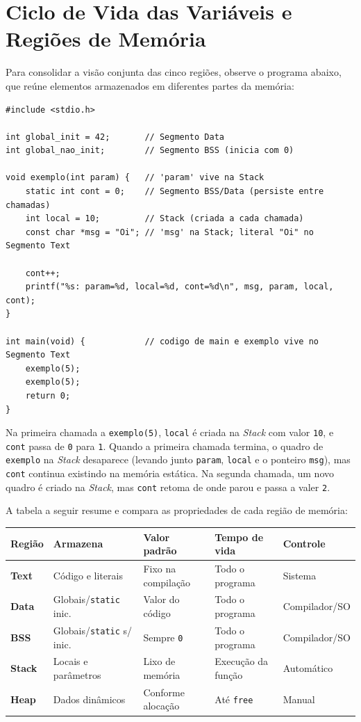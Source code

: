 \section{Ciclo de Vida das Variáveis e Regiões de Memória}
\label{sec:ciclo-vida-regioes}

Para consolidar a visão conjunta das cinco regiões, observe o programa abaixo, que reúne elementos armazenados em diferentes partes da memória:

\begin{lstlisting}
#include <stdio.h>

int global_init = 42;       // Segmento Data
int global_nao_init;        // Segmento BSS (inicia com 0)

void exemplo(int param) {   // 'param' vive na Stack
    static int cont = 0;    // Segmento BSS/Data (persiste entre chamadas)
    int local = 10;         // Stack (criada a cada chamada)
    const char *msg = "Oi"; // 'msg' na Stack; literal "Oi" no Segmento Text

    cont++;
    printf("%s: param=%d, local=%d, cont=%d\n", msg, param, local, cont);
}

int main(void) {            // codigo de main e exemplo vive no Segmento Text
    exemplo(5);
    exemplo(5);
    return 0;
}
\end{lstlisting}

Na primeira chamada a \texttt{exemplo(5)}, \texttt{local} é criada na \textit{Stack} com valor \texttt{10}, e \texttt{cont} passa de \texttt{0} para \texttt{1}. Quando a primeira chamada termina, o quadro de \texttt{exemplo} na \textit{Stack} desaparece (levando junto \texttt{param}, \texttt{local} e o ponteiro \texttt{msg}), mas \texttt{cont} continua existindo na memória estática. Na segunda chamada, um novo quadro é criado na \textit{Stack}, mas \texttt{cont} retoma de onde parou e passa a valer \texttt{2}.

A tabela a seguir resume e compara as propriedades de cada região de memória:

\begin{center}
\footnotesize
\begin{tabular}{|l|l|l|l|l|}
\hline
\textbf{Região} & \textbf{Armazena} & \textbf{Valor padrão} & \textbf{Tempo de vida} & \textbf{Controle} \\
\hline
\textbf{Text} & Código e literais & Fixo na compilação & Todo o programa & Sistema \\
\hline
\textbf{Data} & Globais/\texttt{static} inic. & Valor do código & Todo o programa & Compilador/SO \\
\hline
\textbf{BSS} & Globais/\texttt{static} s/ inic. & Sempre \texttt{0} & Todo o programa & Compilador/SO \\
\hline
\textbf{Stack} & Locais e parâmetros & Lixo de memória & Execução da função & Automático \\
\hline
\textbf{Heap} & Dados dinâmicos & Conforme alocação & Até \texttt{free} & Manual \\
\hline
\end{tabular}
\end{center}

